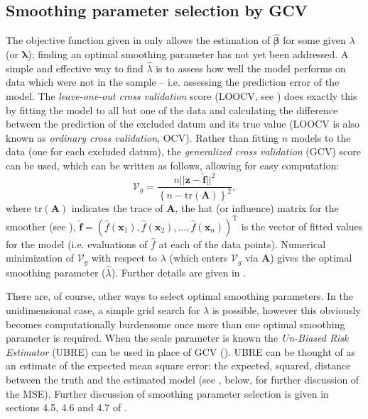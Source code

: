 \subsection{Smoothing parameter selection by GCV}
\label{GAMfitting}

The objective function given in  only allows the estimation of $\bm{\hat{\beta}}$ for some given $\lambda$ (or $\bm{\lambda}$); finding an optimal smoothing parameter has not yet been addressed.  A simple and effective way to find $\hat{\lambda}$ is to assess how well the model performs on data which were not in the sample -- i.e. assessing the prediction error of the model. The \textit{leave-one-out cross validation} score (LOOCV, see ) does exactly this by fitting the model to all but one of the data and calculating the difference between the prediction of the excluded datum and its true value (LOOCV is also known as \textit{ordinary cross validation}, OCV). Rather than fitting $n$ models to the data (one for each excluded datum), the \textit{generalized cross validation} (GCV) score can be used, which can be written as follows, allowing for easy computation:
\begin{equation}
\mathcal{V}_g = \frac{n \lvert\lvert \mathbf{z} - \mathbf{\hat{f}}\rvert \rvert^2}{\left \{n-\text{tr}(\mathbf{A}) \right \}^2},
\label{intro-GCV}
\end{equation}
where $\text{tr}(\mathbf{A})$ indicates the trace of $\mathbf{A}$, the hat (or influence) matrix for the smoother (see ), $\mathbf{\hat{f}}=\left(\hat{f}(\mathbf{x}_1), \hat{f}(\mathbf{x}_2), \ldots, \hat{f}(\mathbf{x}_n)\right)^\text{T}$ is the vector of fitted values for the model (i.e. evaluations of $\hat{f}$ at each of the data points). Numerical minimization of $\mathcal{V}_g$ with respect to $\lambda$ (which enters $\mathcal{V}_g$ via $\mathbf{A}$) gives the optimal smoothing parameter ($\hat{\lambda}$). Further details are given in . 

\label{cor-r9}There are, of course, other ways to select optimal smoothing parameters. In the unidimensional case, a simple grid search for $\lambda$ is possible, however this obviously becomes computationally burdensome once more than one optimal smoothing parameter is required. When the scale parameter is known the \textit{Un-Biased Risk Estimator} (UBRE) can be used in place of GCV (\cite{craven}). UBRE can be thought of as an estimate of the expected mean square error: the expected, squared, distance between the truth and the estimated model (see , below, for further discussion of the MSE). Further discussion of smoothing parameter selection is given in sections 4.5, 4.6 and 4.7 of .

